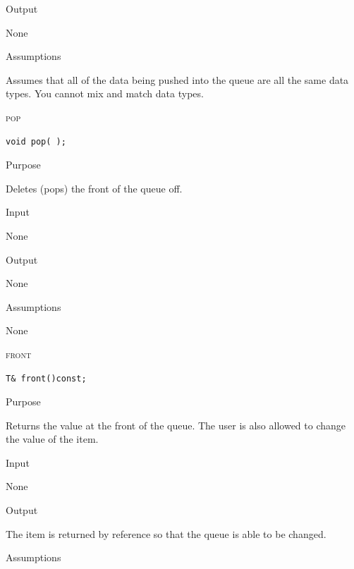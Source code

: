 \documentclass[pdftex, 11pt]{article}
\begin{document}
\begin{description}
\begin{description}
			\item{Output}
				
				None

			\item{Assumptions}

				Assumes that all of the data being pushed into
				the queue are all the same data types. You
				cannot mix and match data types.

		\end{description}
	\item{\textsc{pop}}

		\begin{lstlisting}
void pop( );
		\end{lstlisting}

		\begin{description}
			\item{Purpose}
				
				Deletes (pops) the front of the queue off.

			\item{Input}

				None

			\item{Output}
				
				None

			\item{Assumptions}

				None

		\end{description}
	\item{\textsc{front}}

		\begin{lstlisting}
T& front()const;
		\end{lstlisting}

		\begin{description}
			\item{Purpose}
				
				Returns the value at the front of the queue. The
				user is also allowed to change the value of the
				item.

			\item{Input}

				None

			\item{Output}
				
				The item is returned by reference so that the
				queue is able to be changed.

			\item{Assumptions}


\end{description}
\end{description}
\end{document}
